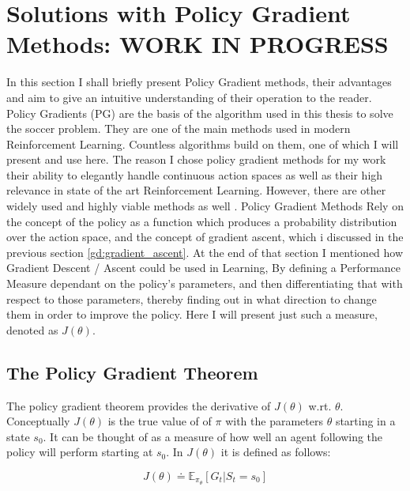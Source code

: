 \newpage
\section{Solutions with Policy Gradient Methods: WORK IN PROGRESS}\label{sec:policy_gradient}
\noindent
In this section I shall briefly present Policy Gradient methods, their advantages and aim to give an intuitive understanding of their operation to the reader. Policy Gradients (PG) are the basis of the algorithm used in this thesis to solve the soccer problem. They are one of the main methods used in modern Reinforcement Learning. Countless algorithms build on them, one of which I will present and use here. The reason I chose policy gradient methods for my work their ability to elegantly handle continuous action spaces as well as their high relevance in state of the art Reinforcement Learning. However, there are other widely used and highly viable methods as well \cite{arulkumaran_brief_2017}. Policy Gradient Methods Rely on the concept of the policy as a function which produces a probability distribution over the action space, and the concept of gradient ascent, which i discussed in the previous section \ref{gd:gradient_ascent}. At the end of that section I mentioned how Gradient Descent / Ascent could be used in Learning, By defining a Performance Measure dependant on the policy's parameters, and then differentiating that with respect to those parameters, thereby finding out in what direction to change them in order to improve the policy. Here I will present just such a measure, denoted as $J(\theta)$. 

\subsection{The Policy Gradient Theorem}\label{subsec:pg:theorem}
The policy gradient theorem provides the derivative of $J(\theta)$ w.rt. $\theta$. Conceptually $J(\theta)$ is the true value of of $\pi$ with the parameters $\theta$ starting in a state $s_0$. It can be thought of as a measure of how well an agent following the policy will perform starting at $s_0$. In \cite{sutton_reinforcement_2018} $J(\theta)$ it is defined as follows:

\begin{equation}\label{pg:performance_measure}
    J(\theta) \doteq \mathbb{E}_{\pi_\theta}[G_t|S_t=s_0]
\end{equation}

